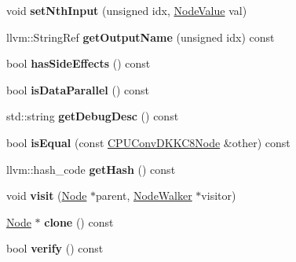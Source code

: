 \begin{DoxyCompactItemize}
\item 
\mbox{\label{classglow_1_1_c_p_u_conv_d_k_k_c8_node_ab23eec022857a04da33167b3b23775cc}} 
void {\bfseries set\+Nth\+Input} (unsigned idx, \hyperlink{structglow_1_1_node_value}{Node\+Value} val)
\item 
\mbox{\label{classglow_1_1_c_p_u_conv_d_k_k_c8_node_af76fa5b11b2da4472a86103ccabf282b}} 
llvm\+::\+String\+Ref {\bfseries get\+Output\+Name} (unsigned idx) const
\item 
\mbox{\label{classglow_1_1_c_p_u_conv_d_k_k_c8_node_a80ae4179776b9c608a30289ce86bd547}} 
bool {\bfseries has\+Side\+Effects} () const
\item 
\mbox{\label{classglow_1_1_c_p_u_conv_d_k_k_c8_node_aae4b302e5e22afec05f5bf7113efee50}} 
bool {\bfseries is\+Data\+Parallel} () const
\item 
\mbox{\label{classglow_1_1_c_p_u_conv_d_k_k_c8_node_ad5d98bf3d02717d14167706c115c0c1a}} 
std\+::string {\bfseries get\+Debug\+Desc} () const
\item 
\mbox{\label{classglow_1_1_c_p_u_conv_d_k_k_c8_node_afe0f078e7bede5b68bb9f2808296c64f}} 
bool {\bfseries is\+Equal} (const \hyperlink{classglow_1_1_c_p_u_conv_d_k_k_c8_node}{C\+P\+U\+Conv\+D\+K\+K\+C8\+Node} \&other) const
\item 
\mbox{\label{classglow_1_1_c_p_u_conv_d_k_k_c8_node_adc980ab2bc017f5cca0f48bfa5898721}} 
llvm\+::hash\+\_\+code {\bfseries get\+Hash} () const
\item 
\mbox{\label{classglow_1_1_c_p_u_conv_d_k_k_c8_node_aaff3d5522787d9a32276c5487821a0e9}} 
void {\bfseries visit} (\hyperlink{classglow_1_1_node}{Node} $\ast$parent, \hyperlink{classglow_1_1_node_walker}{Node\+Walker} $\ast$visitor)
\item 
\mbox{\label{classglow_1_1_c_p_u_conv_d_k_k_c8_node_aed1251b799460b477005f769426a9e3e}} 
\hyperlink{classglow_1_1_node}{Node} $\ast$ {\bfseries clone} () const
\item 
\mbox{\label{classglow_1_1_c_p_u_conv_d_k_k_c8_node_a858c58b3a2e88bece9e31289bf01eaba}} 
bool {\bfseries verify} () const
\end{DoxyCompactItemize}
